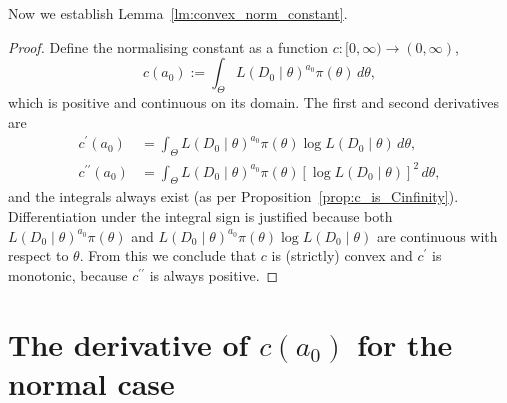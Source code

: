 \documentclass[a4paper, notitlepage, 11pt]{article}
\begin{document}
Now we establish Lemma~\ref{lm:convex_norm_constant}.
\begin{proof}
Define the normalising constant as a function $c : [0, \infty) \to (0, \infty)$,
\begin{equation}
 \label{eq:normconst}
 c(a_0) := \int_{\Theta} L(D_0 \mid \theta)^{a_0} \pi(\theta)\, d\theta,
\end{equation}
which is positive and continuous on its domain.
The first and second derivatives are
\begin{align}
\label{eq:derivative_ca0}
c^\prime(a_0) &= \int_{\Theta} L(D_0 \mid \theta)^{a_0} \pi(\theta) \log L(D_0 \mid \theta) \, d\theta, \\
c^{\prime\prime}(a_0) &= \int_{\Theta} L(D_0 \mid \theta)^{a_0} \pi(\theta) [\log L(D_0 \mid \theta)]^2 \, d\theta,
\end{align}
and the integrals always exist (as per Proposition~\ref{prop:c_is_Cinfinity}).
Differentiation under the integral sign is justified because both $L(D_0 \mid \theta)^{a_0} \pi(\theta)$ and $L(D_0 \mid \theta)^{a_0} \pi(\theta) \log L(D_0 \mid \theta)$ are continuous with respect to $\theta$.
From this we conclude that $c$ is (strictly) convex and $c^\prime$ is monotonic, because $c^{\prime\prime}$ is always positive.
\end{proof}

\section{The derivative of $c(a_0)$ for the normal case}
\label{sec:ca0_norm_deriv}
\end{document}
